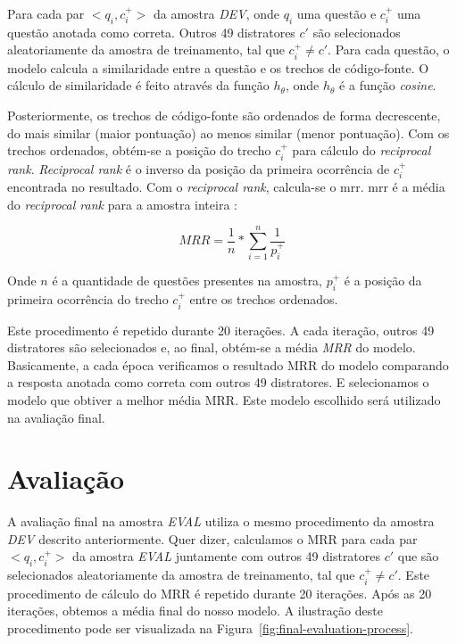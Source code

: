 Para cada par $<q_{i}, c_{i}^{+}>$ da amostra \emph{DEV}, onde $q_{i}$ uma questão e $c_{i}^{+}$ uma questão anotada como correta. Outros 49 distratores $c'$ são selecionados aleatoriamente da amostra de treinamento, tal que $c_{i}^{+} \neq c'$. Para cada questão, o modelo calcula a similaridade entre a questão e os trechos de código-fonte. O cálculo de similaridade é feito através da função $h_{\theta}$, onde $h_{\theta}$ é a função \textit{cosine}. 

Posteriormente, os trechos de código-fonte são ordenados de forma decrescente, do mais similar (maior pontuação) ao menos similar (menor pontuação). Com os trechos ordenados, obtém-se a posição do trecho $c_{i}^{+}$ para cálculo do \textit{reciprocal rank}. \textit{Reciprocal rank} é o inverso da posição da primeira ocorrência de $c_{i}^{+}$ encontrada no resultado. Com o \textit{reciprocal rank}, calcula-se o \acrshort{mrr}. \acrshort{mrr} é a média do \textit{reciprocal rank} para a amostra inteira \citep{Gu-deep-code-search:2018}:

\begin{equation}\label{eq:mrr}
MRR = \frac{1}{n} * \sum_{i = 1}^{n}\frac{1}{p_{i}^{+}}    
\end{equation}

Onde $n$ é a quantidade de questões presentes na amostra, $p_{i}^{+}$ é a posição da primeira ocorrência do trecho $c_{i}^{+}$ entre os trechos ordenados. 

Este procedimento é repetido durante 20 iterações. A cada iteração, outros 49 distratores são selecionados e, ao final, obtém-se a média \emph{MRR} do modelo. Basicamente, a cada época verificamos o resultado MRR do modelo comparando a resposta anotada como correta com outros 49 distratores. E selecionamos o modelo que obtiver a melhor média MRR. Este modelo escolhido será utilizado na avaliação final.

\section{Avaliação}
\label{sec:avaliacao}

A avaliação final na amostra \emph{EVAL} utiliza o mesmo procedimento da amostra \emph{DEV} descrito anteriormente. Quer dizer, calculamos o MRR para cada par $<q_{i}, c_{i}^{+}>$ da amostra \emph{EVAL} juntamente com outros 49 distratores $c'$ que são selecionados aleatoriamente da amostra de treinamento, tal que $c_{i}^{+} \neq c'$. Este procedimento de cálculo do MRR é repetido durante 20 iterações. Após as 20 iterações, obtemos a média final do nosso modelo. A ilustração deste procedimento pode ser visualizada na Figura~\ref{fig:final-evaluation-process}.

